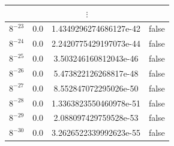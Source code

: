 \documentclass[]{article}
\begin{document}
\begin{table}[!h]
\begin{tabular}{|c|c|c|c|}
			\multicolumn{4}{c}{$\vdots$} \\ \hline
			$8^{-23}$ & 0.0 & 1.4349296274686127e-42 & false \\ \hline
			$8^{-24}$ & 0.0 & 2.2420775429197073e-44 & false \\ \hline
			$8^{-25}$ & 0.0 & 3.503246160812043e-46 & false \\ \hline
			$8^{-26}$ & 0.0 & 5.473822126268817e-48 & false \\ \hline
			$8^{-27}$ & 0.0 & 8.552847072295026e-50 & false \\ \hline
			$8^{-28}$ & 0.0 & 1.3363823550460978e-51 & false \\ \hline
			$8^{-29}$ & 0.0 & 2.088097429759528e-53 & false \\ \hline
			$8^{-30}$ & 0.0 & 3.2626522339992623e-55 & false \\ \hline
		\end{tabular}
	\end{table}
\end{document}
